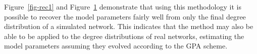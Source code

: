 \documentclass[
  sn-basic,
]{sn-jnl}
\theoremstyle{plain}
\theoremstyle{remark}
\begin{document}
\begin{figure}[H]


\caption{\label{fig-rec2}}

\end{figure}%

Figure~\ref{fig-rec1} and Figure~\ref{fig-rec2} demonstrate that using
this methodology it is possible to recover the model parameters fairly
well from only the final degree distribution of a simulated network.
This indicates that the method may also be able to be applied to the
degree distributions of real networks, estimating the model parameters
assuming they evolved according to the GPA scheme.
\end{document}
